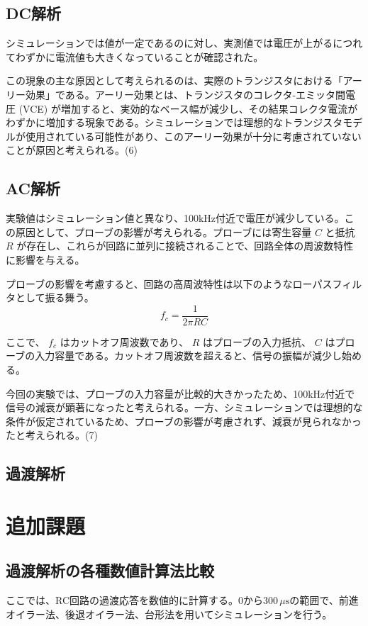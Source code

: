 \documentclass{jlreq}
\numberwithin{equation}{section}
\begin{document}
\subsection{DC解析}
シミュレーションでは値が一定であるのに対し、実測値では電圧が上がるにつれてわずかに電流値も大きくなっていることが確認された。

この現象の主な原因として考えられるのは、実際のトランジスタにおける「アーリー効果」である。アーリー効果とは、トランジスタのコレクタ-エミッタ間電圧 (VCE) が増加すると、実効的なベース幅が減少し、その結果コレクタ電流がわずかに増加する現象である。シミュレーションでは理想的なトランジスタモデルが使用されている可能性があり、このアーリー効果が十分に考慮されていないことが原因と考えられる。(6)

\subsection{AC解析}
実験値はシミュレーション値と異なり、100kHz付近で電圧が減少している。この原因として、プローブの影響が考えられる。プローブには寄生容量 \( C \) と抵抗 \( R \) が存在し、これらが回路に並列に接続されることで、回路全体の周波数特性に影響を与える。

プローブの影響を考慮すると、回路の高周波特性は以下のようなローパスフィルタとして振る舞う。
\[
f_c = \frac{1}{2 \pi R C}
\]

ここで、 \( f_c \) はカットオフ周波数であり、 \( R \) はプローブの入力抵抗、 \( C \) はプローブの入力容量である。カットオフ周波数を超えると、信号の振幅が減少し始める。

今回の実験では、プローブの入力容量が比較的大きかったため、100kHz付近で信号の減衰が顕著になったと考えられる。一方、シミュレーションでは理想的な条件が仮定されているため、プローブの影響が考慮されず、減衰が見られなかったと考えられる。(7)

\subsection{過渡解析}


\section{追加課題}

\subsection{過渡解析の各種数値計算法比較}
ここでは、RC回路の過渡応答を数値的に計算する。$0$から$300\,\mu\mathrm{s}$の範囲で、前進オイラー法、後退オイラー法、台形法を用いてシミュレーションを行う。
\end{document}
